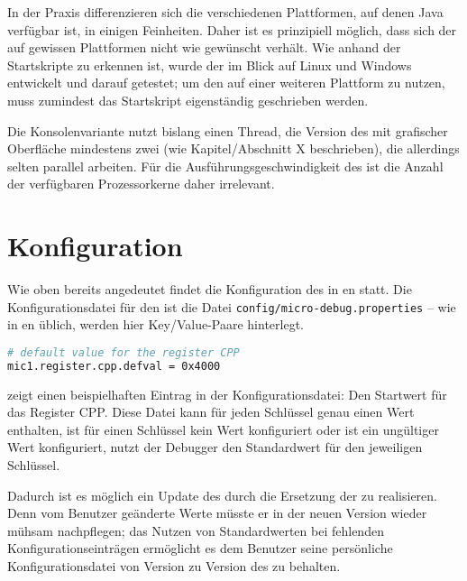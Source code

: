 In der Praxis differenzieren sich die verschiedenen Plattformen, auf denen Java verfügbar ist, in einigen Feinheiten. Daher ist es prinzipiell möglich, dass sich der \md auf gewissen Plattformen nicht wie gewünscht verhält. Wie anhand der Startskripte zu erkennen ist, wurde der \md im Blick auf Linux und Windows entwickelt und darauf getestet; um den \md auf einer weiteren Plattform zu nutzen, muss zumindest das Startskript eigenständig geschrieben werden.

Die Konsolenvariante nutzt bislang einen Thread, die Version des \md mit grafischer Oberfläche mindestens zwei (wie Kapitel/Abschnitt X beschrieben), die allerdings selten parallel arbeiten. Für die Ausführungsgeschwindigkeit des \md ist die Anzahl der verfügbaren Prozessorkerne daher irrelevant.

\section{Konfiguration}
Wie oben bereits angedeutet findet die Konfiguration des \md in en statt. Die Konfigurationsdatei für den \md ist die Datei \texttt{config/micro-debug.properties} -- wie in en üblich, werden hier Key/Value-Paare hinterlegt.

\begin{lstlisting}[language=sh,caption={Eintrag in \texttt{conf/micro-debug.properties}},label=\lstlbl{md-props-entry}]
# default value for the register CPP
mic1.register.cpp.defval = 0x4000
\end{lstlisting}

 zeigt einen beispielhaften Eintrag in der Konfigurationsdatei: Den Startwert für das Register CPP. Diese Datei kann für jeden Schlüssel genau einen Wert enthalten, ist für einen Schlüssel kein Wert konfiguriert oder ist ein ungültiger Wert konfiguriert, nutzt der Debugger den Standardwert für den jeweiligen Schlüssel.

Dadurch ist es möglich ein Update des \md durch die Ersetzung der  zu realisieren. Denn vom Benutzer geänderte Werte müsste er in der neuen Version wieder mühsam nachpflegen; das Nutzen von Standardwerten bei fehlenden Konfigurationseinträgen ermöglicht es dem Benutzer seine persönliche Konfigurationsdatei von Version zu Version des \md zu behalten.

